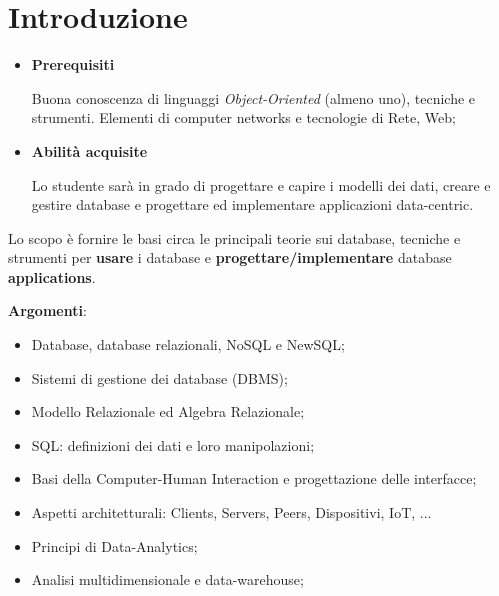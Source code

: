
\chapter{Introduzione}
\label{cap:intro}

\begin{itemize}

\item{\textbf{Prerequisiti}}

Buona conoscenza di linguaggi \textit{Object-Oriented} (almeno uno), tecniche e strumenti. Elementi di computer networks e tecnologie di Rete, Web;

\item{\textbf{Abilità acquisite}}

Lo studente sarà in grado di progettare e capire i modelli dei dati, creare e gestire database e progettare ed implementare applicazioni data-centric.

\end{itemize}

Lo scopo è fornire le basi circa le principali teorie sui database, tecniche e strumenti per \textbf{usare} i database e \textbf{progettare/implementare} database \textbf{applications}.

\textbf{Argomenti}:

\begin{itemize}

\item Database, database relazionali, NoSQL e NewSQL;
\item Sistemi di gestione dei database (DBMS);
\item Modello Relazionale ed Algebra Relazionale;
\item SQL: definizioni dei dati e loro manipolazioni;
\item Basi della Computer-Human Interaction e progettazione delle interfacce;
\item Aspetti architetturali: Clients, Servers, Peers, Dispositivi, IoT, ...
\item Principi di Data-Analytics;
\item Analisi multidimensionale e data-warehouse;

\end{itemize}